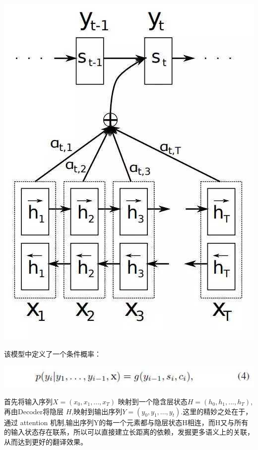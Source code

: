 \documentclass[UTF8,a4paper,10pt]{ctexart}
\begin{document}
    \centerline{\includegraphics[scale=0.3]{pics/190417-s3.jpg}}
    
    
   该模型中定义了一个条件概率：

    \centerline{\includegraphics[scale=0.6]{pics/190417-s2.jpg}}
    
    首先将输入序列$X =(x_0, x_1, ...,x_T)$ 映射到一个隐含层状态$H=(h_0, h_1, ...,h_T)$,再由Decoder将隐层 $H$,映射到输出序列$Y=  (y_0, y_1, ...,y_t)$.这里的精妙之处在于，通过 attention 机制,输出序列Y的每一个元素都与隐层状态H相连，而H又与所有的输入状态存在联系，所以可以直接建立长距离的依赖，发掘更多语义上的关联，从而达到更好的翻译效果。
\end{document}

